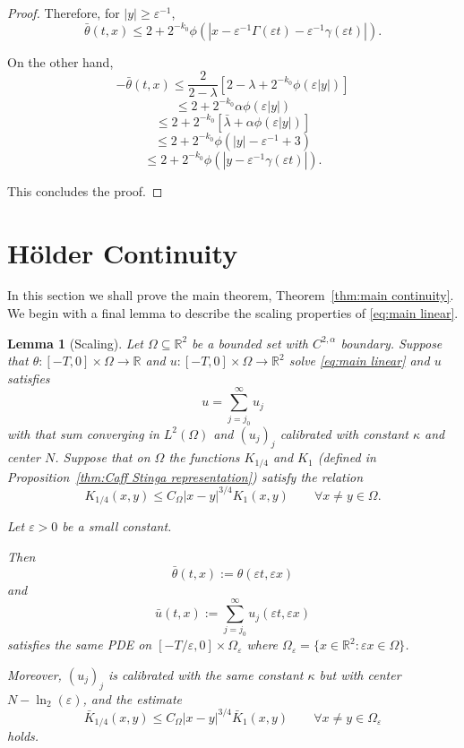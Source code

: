 \documentclass[11pt]{amsart}
\newtheorem{lemma}[theorem]{Lemma}
\theoremstyle{remark}
\theoremstyle{definition}
\newcommand{\R}{\mathbb{R}}
\newcommand{\eps}{\varepsilon}
\newcommand{\norm}[1]{\left\lVert#1\right\rVert}
\newcommand{\bracket}[1]{\left[ #1 \right]}
\newcommand{\n}{^{-1}}
\newcommand{\Comega}{C_\Omega}
\begin{document}
\begin{proof}
Therefore, for $|y| \geq \eps\n$,
\[ \bar{\theta}(t,x) \leq 2 + 2^{-k_0} \phi(|x - \eps\n\Gamma(\eps t) - \eps\n\gamma(\eps t)|). \]

On the other hand, 
\[ -\bar{\theta}(t,x) \leq \frac{2}{2-\lambda} \bracket{2 -\lambda + 2^{-k_0} \phi(\eps |y|)} \]
\[ \leq 2 + 2^{-k_0} \alpha \phi(\eps |y|) \]
\[ \leq 2 + 2^{-k_0} \bracket{\bar{\lambda} + \alpha \phi(\eps |y|)} \]
\[ \leq 2 + 2^{-k_0} \phi(|y| - \eps\n + 3) \]
\[ \leq 2 + 2^{-k_0} \phi(|y-\eps\n\gamma(\eps t)|). \]

This concludes the proof.  
\end{proof}


\section{H\"{o}lder Continuity} \label{sec:holder}

In this section we shall prove the main theorem, Theorem~\ref{thm:main continuity}.  We begin with a final lemma to describe the scaling properties of \eqref{eq:main linear}.  

\begin{lemma}[Scaling] \label{thm:scaling}
Let $\Omega \subseteq \R^2$ be a bounded set with $C^{2,\alpha}$ boundary.  Suppose that $\theta:[-T,0] \times \Omega \to \R$ and $u:[-T,0]\times \Omega \to \R^2$ solve \eqref{eq:main linear} and $u$ satisfies
\[ u = \sum_{j=j_0}^\infty u_j \]
with that sum converging in $L^2(\Omega)$ and $(u_j)_j$ calibrated with constant $\kappa$ and center $N$.  Suppose that on $\Omega$ the functions $K_{1/4}$ and $K_1$ (defined in Proposition~\ref{thm:Caff Stinga representation}) satisfy the relation
\begin{equation} \label{scaling 1/4 to 1 property} K_{1/4}(x,y) \leq \Comega |x-y|^{3/4} K_1(x,y) \qquad \forall x\neq y \in \Omega. \end{equation}

Let $\eps>0$ be a small constant. 

Then
\[ \bar{\theta}(t,x) := \theta(\eps t, \eps x) \]
and
\[ \bar{u}(t,x) := \sum_{j=j_0}^\infty u_j(\eps t, \eps x) \]
satisfies the same PDE on $[-T/\eps, 0]\times \Omega_\eps$ where $\Omega_\eps = \{x \in \R^2: \eps x \in \Omega\}$.  

Moreover, $(u_j)_j$ is calibrated with the same constant $\kappa$ but with center $N - \ln_2(\eps)$, and the estimate
\[ \bar{K}_{1/4}(x,y) \leq \Comega |x-y|^{3/4} \bar{K}_1(x,y) \qquad \forall x\neq y \in \Omega_\eps \]
holds.  

\end{lemma}
\end{document}
